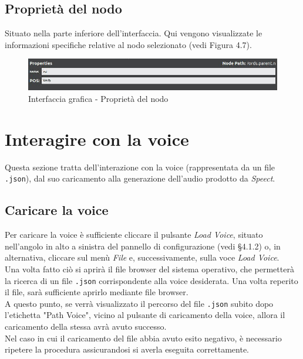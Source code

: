\documentclass[openany,12pt,a4paper]{report}
\begin{document}
 	\subsection{Proprietà del nodo}
 	Situato nella parte inferiore dell'interfaccia. Qui vengono visualizzate le informazioni specifiche relative al nodo selezionato (vedi Figura 4.7).
 		\begin{figure}[H]
 			
 			\centering
 			
 				\includegraphics[width=\textwidth]{./img/proprieta_nodo}
 			
 			\caption{Interfaccia grafica - Proprietà del nodo}
 			
 		\end{figure}
	
	\section{Interagire con la voice}
	Questa sezione tratta dell'interazione con la voice (rappresentata da un file \verb|.json|), dal suo caricamento alla generazione dell'audio prodotto da \textit{Speect}.
	
	\subsection{Caricare la voice}
	Per caricare la voice è sufficiente cliccare il pulsante \textit{Load Voice}, situato nell'angolo in alto a sinistra del pannello di configurazione (vedi §4.1.2) o, in alternativa, cliccare sul menù \textit{File} e, successivamente, sulla voce \textit{Load Voice}.\\
	Una volta fatto ciò si aprirà il file browser del sistema operativo, che permetterà la ricerca di un file \verb|.json| corrispondente alla voice desiderata. Una volta reperito il file, sarà sufficiente aprirlo mediante file browser.\\
	A questo punto, se verrà visualizzato il percorso del file \verb|.json| subito dopo l'etichetta "Path Voice", vicino al pulsante di caricamento della voice, allora il caricamento della stessa avrà avuto successo.\\
	Nel caso in cui il caricamento del file abbia avuto esito negativo, è necessario ripetere la procedura assicurandosi si averla eseguita correttamente.
	
\end{document}
